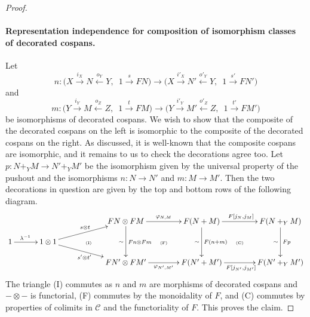 \begin{proof}
\paragraph{Representation independence for composition of isomorphism
classes of decorated cospans.}
Let 
\[
  n\colon  \big(X \stackrel{i_X}\longrightarrow N \stackrel{o_Y}\longleftarrow Y,\enspace 1
\stackrel{s}\longrightarrow FN\big) \longrightarrow \big(X \stackrel{i'_X}\longrightarrow N'
\stackrel{o'_Y}\longleftarrow Y,\enspace 1 \stackrel{s'}\longrightarrow FN'\big)
\]
and
\[
  m\colon  \big(Y \stackrel{i_Y}\longrightarrow M \stackrel{o_Z}\longleftarrow Z,\enspace 1
\stackrel{t}\longrightarrow FM\big) \longrightarrow \big(Y \stackrel{i'_Y}\longrightarrow M'
\stackrel{o'_Z}\longleftarrow Z,\enspace 1 \stackrel{t'}\longrightarrow FM'\big)
\]
be isomorphisms of decorated cospans. We wish to show that the composite of the
decorated cospans on the left is isomorphic to the composite of the decorated
cospans on the right. As discussed, it is well-known that the composite cospans
are isomorphic, and it remains to us to check the decorations agree too. Let $p\colon 
N+_YM \to N'+_YM'$ be the isomorphism given by the universal property of the
pushout and the isomorphisms $n\colon N \to N'$ and $m\colon  M \to M'$. Then the two
decorations in question are given by the top and bottom rows of the following
diagram.
\[
  \xymatrixrowsep{1pc}
  \xymatrixcolsep{1pc}
  \xymatrix{
    &&&& FN \otimes FM \ar[dd]^{Fn \otimes Fm}_\sim
    \ar[rr]^{\varphi_{N,M}} && F(N+M) \ar[dd]^{F(n+m)}_\sim
    \ar[rr]^{F[j_N,j_M]} && F(N+_YM) \ar[dd]^{Fp}_\sim \\ 
    1 \ar[rr]^(.4){\lambda^{-1}} && 1\otimes 1 \ar[urr]^{s \otimes t}
    \ar[drr]_{s' \otimes t'} &
    \qquad\textrm{\tiny(I)} && \textrm{\tiny(F)} && \textrm{\tiny(C)}\\ 
    &&&& FN' \otimes FM' \ar[rr]_{\varphi_{N',M'}} && F(N'+M')
    \ar[rr]_{F[j_{N'},j_{M'}]} && F(N'+_YM')
  }
\]
The triangle (I) commutes as $n$ and $m$ are morphisms of decorated cospans and
$- \otimes -$ is functorial, (F) commutes by the monoidality of $F$, and (C)
commutes by properties of colimits in $\mathcal C$ and the functoriality of $F$.
This proves the claim.


\end{proof}
